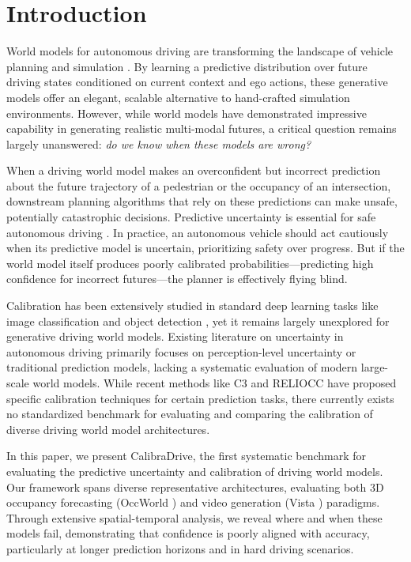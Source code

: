 \section{Introduction}
\label{sec:intro}

World models for autonomous driving are transforming the landscape of vehicle planning and simulation \cite{zheng2024occworld, gao2024vista, hu2023gaia1, wang2023drivedreamer, yang2023unisim}. By learning a predictive distribution over future driving states conditioned on current context and ego actions, these generative models offer an elegant, scalable alternative to hand-crafted simulation environments. However, while world models have demonstrated impressive capability in generating realistic multi-modal futures, a critical question remains largely unanswered: \textit{do we know when these models are wrong?} 

When a driving world model makes an overconfident but incorrect prediction about the future trajectory of a pedestrian or the occupancy of an intersection, downstream planning algorithms that rely on these predictions can make unsafe, potentially catastrophic decisions. Predictive uncertainty is essential for safe autonomous driving \cite{mei2025c3}. In practice, an autonomous vehicle should act cautiously when its predictive model is uncertain, prioritizing safety over progress. But if the world model itself produces poorly calibrated probabilities---predicting high confidence for incorrect futures---the planner is effectively flying blind.

Calibration has been extensively studied in standard deep learning tasks like image classification and object detection \cite{guo2017calibration}, yet it remains largely unexplored for generative driving world models. Existing literature on uncertainty in autonomous driving primarily focuses on perception-level uncertainty or traditional prediction models, lacking a systematic evaluation of modern large-scale world models. While recent methods like C3 \cite{mei2025c3} and RELIOCC have proposed specific calibration techniques for certain prediction tasks, there currently exists no standardized benchmark for evaluating and comparing the calibration of diverse driving world model architectures.

In this paper, we present CalibraDrive, the first systematic benchmark for evaluating the predictive uncertainty and calibration of driving world models. Our framework spans diverse representative architectures, evaluating both 3D occupancy forecasting (OccWorld \cite{zheng2024occworld}) and video generation (Vista \cite{gao2024vista}) paradigms. Through extensive spatial-temporal analysis, we reveal where and when these models fail, demonstrating that confidence is poorly aligned with accuracy, particularly at longer prediction horizons and in hard driving scenarios.

